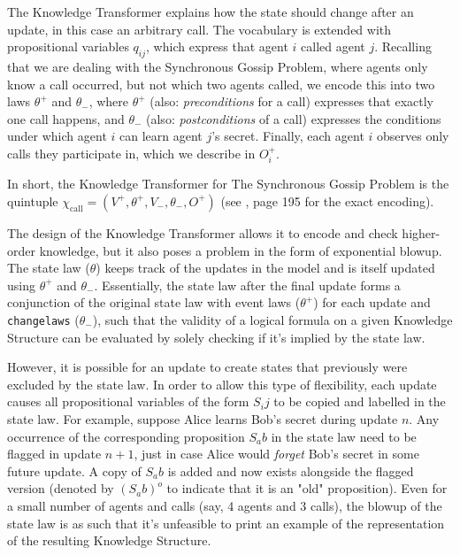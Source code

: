 The Knowledge Transformer explains how the state should change after an update, in this case an arbitrary call. 
The vocabulary is extended with propositional variables $q_{ij}$, which express that agent $i$ called agent $j$. 
Recalling that we are dealing with the Synchronous Gossip Problem, where agents only know a call occurred, 
but not which two agents called, we encode this into two laws $\theta^+$ and $\theta_-$, where $\theta^+$ 
(also: \textit{preconditions} for a call) expresses that exactly one 
call happens, and $\theta_-$ (also: \textit{postconditions} of a call) expresses the conditions under which agent $i$ can 
learn agent $j$'s secret. 
Finally, each agent $i$ observes only calls they participate in, which we describe in $O^+_i$. 

In short, the Knowledge Transformer for The Synchronous Gossip Problem is the quintuple 
$\chi_\text{call}=(V^+,\theta ^+,V_-,\theta _-,O^+)$ (see \cite{GattingerThesis2018}, page 195 for the exact encoding).

The design of the Knowledge Transformer allows it to encode and check higher-order knowledge, but it 
also poses a problem in the form of exponential blowup. The state law ($\theta$) keeps track 
of the updates in the model and is itself updated using $\theta^+$ and $\theta_-$. Essentially, the state law 
after the final update forms a conjunction of the original state law with event laws ($\theta^+$) for each update and 
\texttt{changelaws} ($\theta_-$), 
such that the validity of a logical formula on a given Knowledge Structure can be evaluated by solely checking if it's implied by 
the state law. 

However, it is possible for an update to create states that previously were excluded by the state law. 
In order to allow this type of flexibility, each update causes all propositional variables of the form $S_ij$  
to be copied and labelled in the state law. For example, suppose Alice learns Bob's secret during update $n$. 
Any occurrence of the corresponding proposition $S_ab$ in the state law need to be flagged in update $n+1$, just in case 
Alice would \textit{forget} Bob's secret in some future update. A copy of $S_ab$ is added and now exists alongside the 
flagged version (denoted by $(S_ab)^o$ to indicate that it is an "old" proposition). Even for a small number of agents and 
calls (say, 4 agents and 3 calls), the blowup of the state law is as such that it's unfeasible to print an example of the representation
of the resulting Knowledge Structure.

